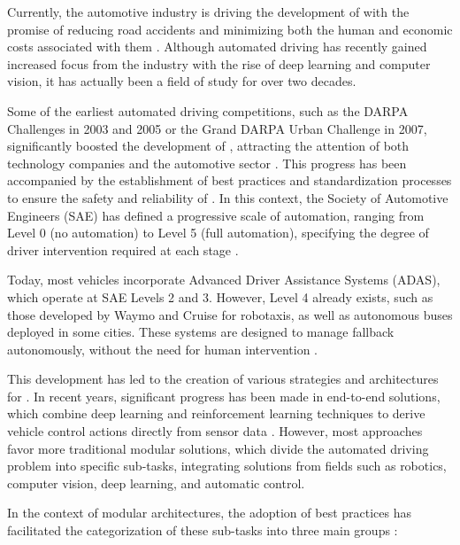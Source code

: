 
Currently, the automotive industry is driving the development of  with the promise of reducing road accidents and minimizing both the human and economic costs associated with them \cite{survey_AutomatedDriving1}. Although automated driving has recently gained increased focus from the industry with the rise of deep learning and computer vision, it has actually been a field of study for over two decades.

Some of the earliest automated driving competitions, such as the DARPA Challenges in 2003 and 2005 or the Grand DARPA Urban Challenge in 2007, significantly boosted the development of , attracting the attention of both technology companies and the automotive sector \cite{survey_AutomatedDriving2}. This progress has been accompanied by the establishment of best practices and standardization processes to ensure the safety and reliability of . In this context, the Society of Automotive Engineers (SAE) has defined a progressive scale of automation, ranging from Level 0 (no automation) to Level 5 (full automation), specifying the degree of driver intervention required at each stage \cite{AD_Technical_Standards}.

Today, most vehicles incorporate Advanced Driver Assistance Systems (ADAS), which operate at SAE Levels 2 and 3. However, Level 4  already exists, such as those developed by Waymo and Cruise for robotaxis, as well as autonomous buses deployed in some cities. These systems are designed to manage fallback autonomously, without the need for human intervention \cite{fallback_strategy}.

This development has led to the creation of various strategies and architectures for . In recent years, significant progress has been made in \mbox{end-to-end} solutions, which combine deep learning and reinforcement learning techniques to derive vehicle control actions directly from sensor data \cite{end_to_end_driving}. However, most approaches favor more traditional modular solutions, which divide the automated driving problem into specific \mbox{sub-tasks}, integrating solutions from fields such as robotics, computer vision, deep learning, and automatic control.

In the context of modular architectures, the adoption of best practices has facilitated the categorization of these \mbox{sub-tasks} into three main groups \cite{machines5010006}\cite{functional_architectures}:  

